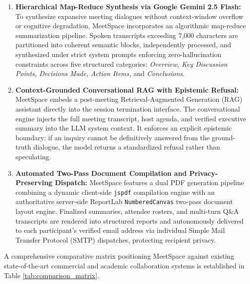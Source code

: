 \documentclass[12pt,oneside,letterpaper]{report}
\numberwithin{equation}{chapter} %
\begin{document}
\begin{enumerate}
    \item \textbf{Hierarchical Map-Reduce Synthesis via Google Gemini 2.5 Flash:} To synthesize expansive meeting dialogues without context-window overflow or cognitive degradation, MeetSpace incorporates an algorithmic map-reduce summarization pipeline. Spoken transcripts exceeding 7,000 characters are partitioned into coherent semantic blocks, independently processed, and synthesized under strict system prompts enforcing zero-hallucination constraints across five structured categories: \textit{Overview, Key Discussion Points, Decisions Made, Action Items,} and \textit{Conclusions}.

    \item \textbf{Context-Grounded Conversational RAG with Epistemic Refusal:} MeetSpace embeds a post-meeting Retrieval-Augmented Generation (RAG) assistant directly into the session termination interface. The conversational engine injects the full meeting transcript, host agenda, and verified executive summary into the LLM system context. It enforces an explicit epistemic boundary: if an inquiry cannot be definitively answered from the ground-truth dialogue, the model returns a standardized refusal rather than speculating.

    \item \textbf{Automated Two-Pass Document Compilation and Privacy-Preserving Dispatch:} MeetSpace features a dual PDF generation pipeline combining a dynamic client-side \texttt{jspdf} compilation engine with an authoritative server-side ReportLab \texttt{NumberedCanvas} two-pass document layout engine. Finalized summaries, attendee rosters, and multi-turn Q\&A transcripts are rendered into structured reports and autonomously delivered to each participant's verified email address via individual Simple Mail Transfer Protocol (SMTP) dispatches, protecting recipient privacy.
\end{enumerate}

A comprehensive comparative matrix positioning MeetSpace against existing state-of-the-art commercial and academic collaboration systems is established in Table \ref{tab:comparison_matrix}.
\end{document}
